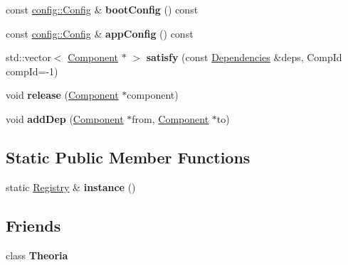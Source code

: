 \begin{DoxyCompactItemize}
\item 
\mbox{\label{classtheoria_1_1core_1_1Registry_ac998e5555375fc21fd7ad6aa3b0a87da}} 
const \hyperlink{classtheoria_1_1config_1_1Config}{config\+::\+Config} \& {\bfseries boot\+Config} () const
\item 
\mbox{\label{classtheoria_1_1core_1_1Registry_a9d1514b8e21145742c0a850e00a90bf9}} 
const \hyperlink{classtheoria_1_1config_1_1Config}{config\+::\+Config} \& {\bfseries app\+Config} () const
\item 
\mbox{\label{classtheoria_1_1core_1_1Registry_aaa8dbdd7993478eea310fa111e36d40a}} 
std\+::vector$<$ \hyperlink{classtheoria_1_1core_1_1Component}{Component} $\ast$ $>$ {\bfseries satisfy} (const \hyperlink{classtheoria_1_1core_1_1Dependencies}{Dependencies} \&deps, Comp\+Id comp\+Id=-\/1)
\item 
\mbox{\label{classtheoria_1_1core_1_1Registry_adead32a72f8f70bac8f01645dc912720}} 
void {\bfseries release} (\hyperlink{classtheoria_1_1core_1_1Component}{Component} $\ast$component)
\item 
\mbox{\label{classtheoria_1_1core_1_1Registry_ad5ada88f383f823f983810b70f80d67b}} 
void {\bfseries add\+Dep} (\hyperlink{classtheoria_1_1core_1_1Component}{Component} $\ast$from, \hyperlink{classtheoria_1_1core_1_1Component}{Component} $\ast$to)
\end{DoxyCompactItemize}
\subsection*{Static Public Member Functions}
\begin{DoxyCompactItemize}
\item 
\mbox{\label{classtheoria_1_1core_1_1Registry_ac36dbf9ae74e19b9fe30f57910e3d93a}} 
static \hyperlink{classtheoria_1_1core_1_1Registry}{Registry} \& {\bfseries instance} ()
\end{DoxyCompactItemize}
\subsection*{Friends}
\begin{DoxyCompactItemize}
\item 
\mbox{\label{classtheoria_1_1core_1_1Registry_a03f09b9a4f49119b0c16c42ded7cba64}} 
class {\bfseries Theoria}
\end{DoxyCompactItemize}


